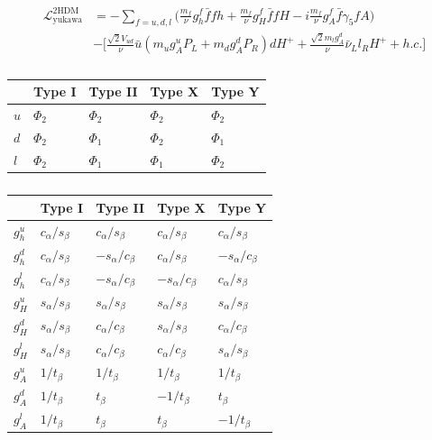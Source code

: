 \begin{equation}
\begin{aligned}
\mathcal{L}^{\text{2HDM}}_{\text{yukawa}} &= - \sum_{f=u,d,l}\Big(\frac{m_{f}}{\nu}g^{f}_{h}\bar{f}fh + \frac{m_{f}}{\nu}g^{f}_{H}\bar{f}fH -i\frac{m_{f}}{\nu}g^{f}_{A}\bar{f}\gamma_{5}fA\Big)  \\ 
&- \Big[\frac{\sqrt{2}V_{ud}}{\nu}\bar{u}(m_{u}g^{u}_{A}P_{L} + m_{d}g^{d}_{A}P_{R})dH^{+} + \frac{\sqrt{2}m_{l}g^{d}_{A}}{\nu}\bar{\nu}_{L}l_{R}H^{+} + h.c.\Big]
\end{aligned}
\end{equation}

\begin{table}[H]
    \centering
    \begin{tabular}{|x{1.0cm}|x{2.0cm}x{2.0cm}x{2.0cm}x{2.0cm}|}
    		\hline
    	 	& Type I & Type II & Type X & Type Y \\
    	 	\hline
    	 	\hline
    	 	$u$ & $\Phi_2$ & $\Phi_2$  & $\Phi_2$  & $\Phi_2$  \\ 
    	 	$d$ & $\Phi_2$ & $\Phi_1$ & $\Phi_2$ & $\Phi_1$ \\
    	 	$l$ & $\Phi_2$ & $\Phi_1$   & $\Phi_1$    & $\Phi_2$ \\
        \hline
    \end{tabular}
    \caption{}
\end{table}

\begin{table}[H]
    \centering
    \begin{tabular}{|x{1.0cm}|x{2.0cm}x{2.0cm}x{2.0cm}x{2.0cm}|}
    		\hline
    	 	& Type I & Type II & Type X & Type Y \\
    	 	\hline
    	 	\hline
    	 	$g_{h}^{u}$ & $c_{\alpha}/s_{\beta}$ & $c_{\alpha}/s_{\beta}$  & $c_{\alpha}/s_{\beta}$  & $c_{\alpha}/s_{\beta}$  \\ 
    	 	$g_{h}^{d}$ & $c_{\alpha}/s_{\beta}$ & $-s_{\alpha}/c_{\beta}$ & $c_{\alpha}/s_{\beta}$  & $-s_{\alpha}/c_{\beta}$ \\
    	 	$g_{h}^{l}$ & $c_{\alpha}/s_{\beta}$ & $-s_{\alpha}/c_{\beta}$ & $-s_{\alpha}/c_{\beta}$ & $c_{\alpha}/s_{\beta}$  \\
    	 	\hline
    	 	$g_{H}^{u}$ & $s_{\alpha}/s_{\beta}$ & $s_{\alpha}/s_{\beta}$ & $s_{\alpha}/s_{\beta}$ & $s_{\alpha}/s_{\beta}$ \\
    	 	$g_{H}^{d}$ & $s_{\alpha}/s_{\beta}$ & $c_{\alpha}/c_{\beta}$ & $s_{\alpha}/s_{\beta}$ & $c_{\alpha}/c_{\beta}$ \\
    	 	$g_{H}^{l}$ & $s_{\alpha}/s_{\beta}$ & $c_{\alpha}/c_{\beta}$ & $c_{\alpha}/c_{\beta}$ & $s_{\alpha}/s_{\beta}$ \\
    	 	\hline
    	 	$g_{A}^{u}$ & $1/t_{\beta}$ & $1/t_{\beta}$ & $1/t_{\beta}$  & $1/t_{\beta}$ \\
    	 	$g_{A}^{d}$ & $1/t_{\beta}$ & $t_{\beta}$   & $-1/t_{\beta}$ & $t_{\beta}$ \\
    	 	$g_{A}^{l}$ & $1/t_{\beta}$ & $t_{\beta}$   & $t_{\beta}$    & $-1/t_{\beta}$ \\
        \hline
    \end{tabular}
    \caption{}
\end{table}

